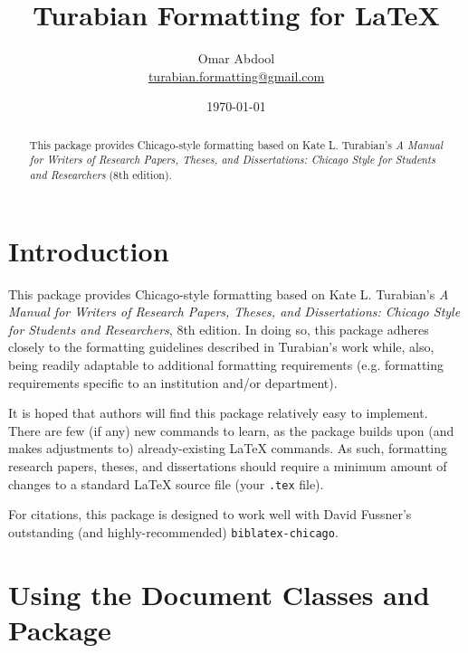 \documentclass{article}
\title{Turabian Formatting for \LaTeX{}}
\author{Omar Abdool \\
{\normalsize \href{mailto:turabian.formatting@gmail.com}{turabian.formatting@gmail.com}}}
\date{\today}
\begin{document}
\maketitle

\renewcommand{\abstractname}{}

\begin{abstract}
\noindent This package provides Chicago-style formatting based on Kate L. Turabian's \emph{A Manual for Writers of Research Papers, Theses, and Dissertations: Chicago Style for Students and Researchers} (8th edition).
\end{abstract}


\tableofcontents



\reversemarginpar
\setlength\parindent{0in}
\setlength\parskip{1\baselineskip}



\section*{Introduction}
\label{sec:introduction}

This package provides Chicago-style formatting based on Kate L. Turabian's \emph{A Manual for Writers of Research Papers, Theses, and Dissertations: Chicago Style for Students and Researchers}, 8th edition. In doing so, this package adheres closely to the formatting guidelines described in Turabian's work while, also, being readily adaptable to additional formatting requirements (e.g. formatting requirements specific to an institution and/or department).

It is hoped that authors will find this package relatively easy to implement. There are few (if any) new commands to learn, as the package builds upon (and makes adjustments to) already-existing \LaTeX{} commands. As such, formatting research papers, theses, and dissertations should require a minimum amount of changes to a standard \LaTeX{} source file (your \texttt{.tex} file).

For citations, this package is designed to work well with David Fussner's outstanding (and highly-recommended) \texttt{biblatex-chicago}.



\section{Using the Document Classes and Package}
\label{sec:implementation}
\end{document}
